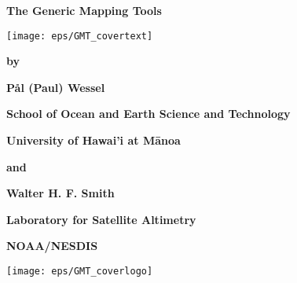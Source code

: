 %
%

\thispagestyle{empty}

\begin{center}
\huge
\textbf{The Generic Mapping Tools}\par 
\vspace{0.5\baselineskip}

\texttt{[image: eps/GMT\_covertext]} 

\Huge
\textbf{\GMTDOCVERSION}\par 
\vspace{0.25\baselineskip}

\huge
\textbf{\GMTTITLE}\par 

\large
\vspace{0.75\baselineskip}
\textbf{by}\par 
\vspace{0.75\baselineskip}

\huge
\textbf{P\aa l (Paul) Wessel}\par 
\vspace{0.5\baselineskip}

\Large
\textbf{School of Ocean and Earth Science and Technology}\par 
\textbf{University of Hawai'i at M\={a}noa}\par 

\large
\vspace{0.75\baselineskip}
\textbf{and}\par 
\vspace{0.75\baselineskip}

\huge
\textbf{Walter H. F. Smith}\par 
\vspace{0.5\baselineskip}

\Large
\textbf{Laboratory for Satellite Altimetry}\par 
\textbf{NOAA/NESDIS}\par 
\vspace{0.5\baselineskip}

\large
\textbf{\GMTDOCDATE}\par 
\vspace{\baselineskip}

\texttt{[image: eps/GMT\_coverlogo]}
\end{center}
